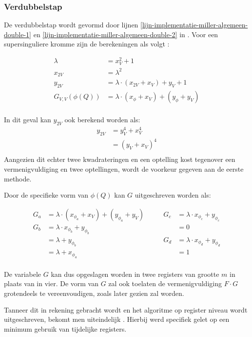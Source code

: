 \subsubsection{Verdubbelstap}

De verdubbelstap wordt gevormd door lijnen \ref{lijn-implementatie-miller-algemeen-double-1} en \ref{lijn-implementatie-miller-algemeen-double-2} in . Voor een supersinguliere kromme zijn de berekeningen als volgt \cite{bertoni, hankerson-book}:

\[\begin{aligned}
	\lambda &= x_V^2 + 1\\
	x_{2V} &= \lambda ^2\\
	y_{2V} &= \lambda \cdot (x_{2V} + x_V) + y_V + 1\\
	G_{V,V}(\phi(Q)) &= \lambda \cdot (x_{\phi} + x_V) + (y_{\phi} + y_V)\\
\end{aligned}\]

In dit geval kan $y_{2V}$ ook berekend worden als:
\[\begin{aligned}
y_{2V}	&= y_V^4 + x_V^4\\
			&= (y_V + x_V)^4\\
\end{aligned}\]
Aangezien dit echter twee kwadrateringen en een optelling kost tegenover een vermenigvuldiging en twee optellingen, wordt de voorkeur gegeven aan de eerste methode.

Door de specifieke vorm van $\phi(Q)$ kan $G$ uitgeschreven worden als:

\[\begin{aligned}
	G_a	&=	\lambda \cdot (x_{\phi_a} + x_V) + (y_{\phi_a} + y_V)\qquad&
				G_c	&= \lambda \cdot x_{\phi_c} + y_{\phi_c}\\
	G_b	&=	\lambda \cdot x_{\phi_b} + y_{\phi_b}&
						&= 0\\
			&= \lambda + y_{\phi_b}&
				G_d	&= \lambda \cdot x_{\phi_d} + y_{\phi_d}\\
			&=	\lambda + x_{\phi_a}&
						&= 1\\
\end{aligned}\]

De variabele $G$ kan dus opgeslagen worden in twee registers van grootte $m$ in plaats van in vier. De vorm van $G$ zal ook toelaten de vermenigvuldiging $F \cdot G$ grotendeels te vereenvoudigen, zoals later gezien zal worden.

Tanneer dit in rekening gebracht wordt en het algoritme op register niveau wordt uitgeschreven, bekomt men uiteindelijk . Hierbij werd specifiek gelet op een minimum gebruik van tijdelijke registers.

